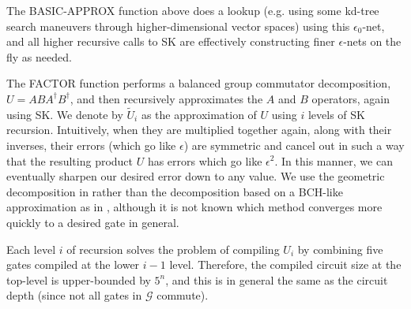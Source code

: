 The BASIC-APPROX function above does a lookup (e.g. using some kd-tree search
maneuvers through higher-dimensional vector spaces) using this $\epsilon_0$-net,
and all higher recursive calls to SK are effectively constructing
finer $\epsilon$-nets on the fly as needed.

The FACTOR function performs a balanced group commutator decomposition,
$U = ABA^\dagger B^\dagger$, and then recursively approximates the $A$ and $B$
operators, again using SK. We denote by $\tilde{U}_i$ as the approximation
of $U$ using $i$ levels of SK recursion. Intuitively, when they are multiplied
together again, along with their inverses, their errors (which go like
$\epsilon$) are symmetric and cancel out in such a way that the resulting
product $U$ has errors which go like $\epsilon^2$. In this manner, we can
eventually sharpen our desired error down to any value. We use the
geometric decomposition in \cite{Dawson2005} rather than the decomposition
based on a BCH-like approximation as in \cite{Harrow2001}, although it is not
known which method converges more quickly to a desired gate in general.


Each level $i$ of recursion solves the problem of compiling 
$U_i$ by combining five gates compiled at the lower $i-1$ level.
Therefore, the compiled circuit size at the top-level is upper-bounded by $5^n$,
and
this is in general the same as the circuit depth (since not all gates in
$\mathcal{G}$ commute).

